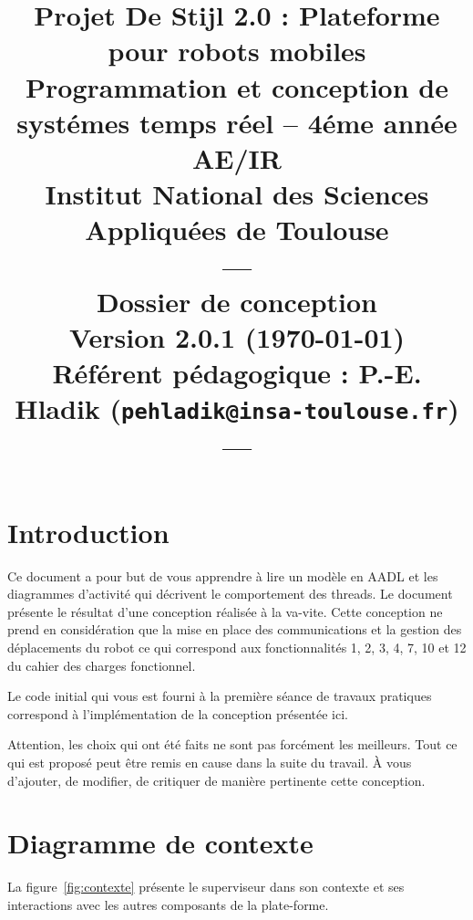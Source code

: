 \documentclass[11pt,a4paper]{paper}
\title{{\Huge Projet De Stijl 2.0}
{\small : Plateforme pour robots mobiles}\\
{\scriptsize Programmation et conception de systémes temps réel -- 4éme année AE/IR}\\
{\scriptsize Institut National des Sciences Appliquées de Toulouse}\\
---\\
Dossier de conception \\
{\large Version 2.0.1 (\today)}\\
{\scriptsize Référent pédagogique : P.-E. Hladik (\texttt{pehladik@insa-toulouse.fr})}\\
---
}
\begin{document}
\maketitle




  \section{Introduction}
\label{sec:premier}

Ce document a pour but de vous apprendre à lire un modèle en AADL et les diagrammes d'activité qui décrivent le comportement des threads. Le document présente le résultat d'une conception réalisée à la va-vite. Cette conception ne prend en considération que la mise en place des communications et la gestion des déplacements du robot ce qui correspond aux fonctionnalités 1, 2, 3, 4, 7, 10 et 12 du cahier des charges fonctionnel.

Le code initial qui vous est fourni à la première séance de travaux pratiques correspond à l'implémentation de la conception présentée ici.

Attention, les choix qui ont été faits ne sont pas forcément les meilleurs. Tout ce qui est proposé peut être remis en cause dans la suite du travail. \`A vous d'ajouter, de modifier, de critiquer de manière pertinente cette conception.

\section{Diagramme de contexte}

La figure~\ref{fig:contexte} présente le superviseur dans son contexte et ses interactions avec les autres composants de la plate-forme.
\end{document}
